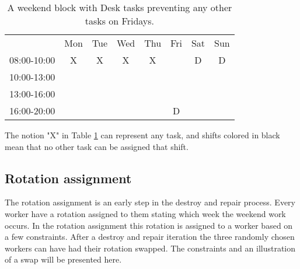 \begin{table}[!h]
\centering
\caption{A weekend block with Desk tasks preventing any other tasks on Fridays.}
\label{Friday_percolation}
\begin{tabular}{cccccccc}
                                 & Mon                    & Tue                    & Wed                    & Thu                    & Fri                                            & Sat                                            & Sun                                            \\ \cline{2-8} 
\multicolumn{1}{c|}{08:00-10:00} & \multicolumn{1}{c|}{X} & \multicolumn{1}{c|}{X} & \multicolumn{1}{c|}{X} & \multicolumn{1}{c|}{X} & \multicolumn{1}{c|}{\cellcolor[HTML]{000000}}  & \multicolumn{1}{c|}{\cellcolor[HTML]{FCFF2F}D} & \multicolumn{1}{c|}{\cellcolor[HTML]{FCFF2F}D} \\ \cline{2-8} 
\multicolumn{1}{c|}{10:00-13:00} & \multicolumn{1}{c|}{}  & \multicolumn{1}{c|}{}  & \multicolumn{1}{c|}{}  & \multicolumn{1}{c|}{}  & \multicolumn{1}{c|}{\cellcolor[HTML]{000000}}  &                                                &                                                \\ \cline{2-6}
\multicolumn{1}{c|}{13:00-16:00} & \multicolumn{1}{c|}{}  & \multicolumn{1}{c|}{}  & \multicolumn{1}{c|}{}  & \multicolumn{1}{c|}{}  & \multicolumn{1}{c|}{\cellcolor[HTML]{000000}}  &                                                &                                                \\ \cline{2-6}
\multicolumn{1}{c|}{16:00-20:00} & \multicolumn{1}{c|}{}  & \multicolumn{1}{c|}{}  & \multicolumn{1}{c|}{}  & \multicolumn{1}{c|}{}  & \multicolumn{1}{c|}{\cellcolor[HTML]{FCFF2F}D} &                                                &                                                \\ \cline{2-6}
\end{tabular}
\end{table}

 The notion "X" in Table \ref{Friday_percolation} can represent any task, and shifts colored in black mean that no other task can be assigned that shift.

\subsection{Rotation assignment} \label{rotation}
The rotation assignment is an early step in the destroy and repair process. Every worker have a rotation assigned to them stating which week the weekend work occurs. In the rotation assignment this rotation is assigned to a worker based on a few constraints. After a destroy and repair iteration the three randomly chosen workers can have had their rotation swapped. The constraints and an illustration of a swap will be presented here.


